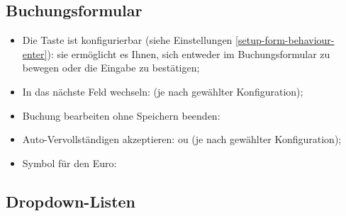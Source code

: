 \subsection{Buchungsformular}

\begin{itemize}
	\item Die Taste  ist konfigurierbar (siehe Einstellungen \vref{setup-form-behaviour-enter}): sie ermöglicht es Ihnen, sich entweder im Buchungsformular zu bewegen oder die Eingabe zu bestätigen;
	\item In das nächste Feld wechseln: \keys{\tab} (je nach gewählter Konfiguration);
	\item Buchung bearbeiten ohne Speichern beenden: \keys{\esc}
	\item Auto-Vervollständigen akzeptieren: \keys{\tab} ou  (je nach gewählter Konfiguration);
	\item Symbol für den Euro: %
\end{itemize}

\subsection{Dropdown-Listen}

